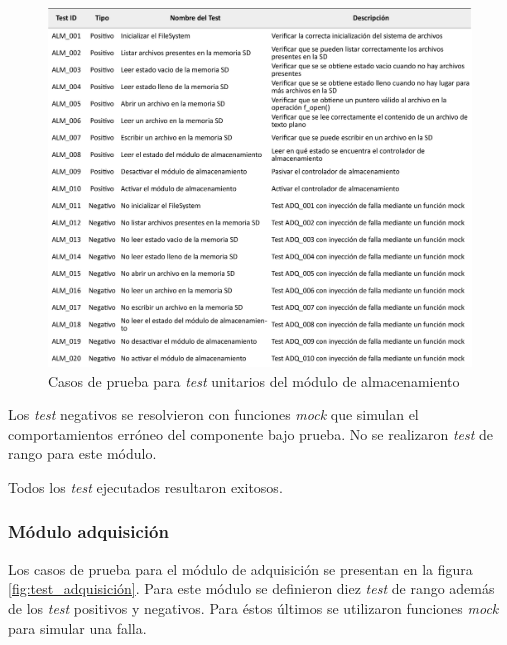 \begin{figure}[htpb]
	\centering
	\includegraphics[width=\textwidth]{./Figures/TestSD.pdf}
	\caption{Casos de prueba para \textit{test} unitarios del módulo de almacenamiento}
	\label{fig:test_almacenamiento}
\end{figure}

Los \textit{test} negativos se resolvieron con funciones \textit{mock} que simulan el comportamientos erróneo del componente bajo prueba.  No se realizaron \textit{test} de rango para este módulo.

Todos los \textit{test} ejecutados resultaron exitosos.

\subsubsection{Módulo adquisición}

Los casos de prueba para el módulo de adquisición se presentan en la figura \ref{fig:test_adquisición}. Para este módulo se definieron diez \textit{test} de rango además de los \textit{test} positivos y negativos.  Para éstos últimos se utilizaron funciones \textit{mock} para simular una falla.

